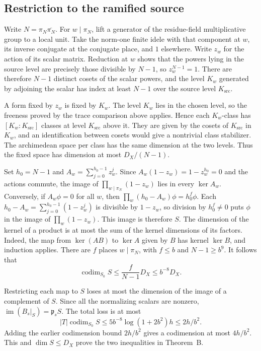 \subsection{Restriction to the ramified source}

Write \(N=\pi_N\overline{\pi_N}\). For \(w\mid\pi_N\), lift a generator
of the residue-field multiplicative group to a local unit.
Take the norm-one finite idele with that component at \(w\), its inverse
conjugate at the conjugate place, and \(1\) elsewhere.
Write \(z_w\) for the action of its scalar matrix.
Reduction at \(w\) shows that the powers lying in the source level
are precisely those divisible by \(N-1\), so \(z_w^{N-1}=1\).
There are therefore \(N-1\) distinct cosets of the scalar powers,
and the level \(K_w\) generated by adjoining the scalar has index at
least \(N-1\) over the source level \(K_{\mathrm{src}}\).

A form fixed by \(z_w\) is fixed by \(K_w\).
The level \(K_w\) lies in the chosen level, so the freeness proved by
the trace comparison above applies. Hence each \(K_w\)-class has
\([K_w:K_{\mathrm{src}}]\) classes at level \(K_{\mathrm{src}}\) above it.
They are given by the cosets of \(K_{\mathrm{src}}\) in \(K_w\), and
an identification between cosets would give a nontrivial class
stabilizer. The archimedean space per class has the same dimension
at the two levels. Thus the fixed space has dimension at most
\(D_X/(N-1)\).

Set \(h_0=N-1\) and \(A_w=\sum_{j=0}^{h_0-1}z_w^j\).
Since \(A_w(1-z_w)=1-z_w^{h_0}=0\) and the actions commute,
the image of \(\prod_{w\mid\pi_N}(1-z_w)\) lies in every \(\ker A_w\).
Conversely, if \(A_w\phi=0\) for all \(w\), then
\(\prod_w(h_0-A_w)\phi=h_0^f\phi\).
Each \(h_0-A_w=\sum_{j=0}^{h_0-1}(1-z_w^j)\) is divisible by \(1-z_w\),
so division by \(h_0^f\ne0\) puts \(\phi\) in the image of
\(\prod_w(1-z_w)\). This image is therefore \(S\).
The dimension of the kernel of a product is at most the sum of the
kernel dimensions of its factors. Indeed, the map from \(\ker(AB)\)
to \(\ker A\) given by \(B\) has kernel \(\ker B\), and induction applies.
There are \(f\) places \(w\mid\pi_N\), with \(f\le b\) and \(N-1\ge b^9\).
It follows that
\[
 \operatorname{codim}_{S_0} S\le \frac{f}{N-1}D_X\le b^{-8}D_X.
\]

Restricting each map to \(S\) loses at most the dimension of the image
of a complement of \(S\). Since all the normalizing scalars are nonzero,
\(\operatorname{im}(B_s|_S)=\mathfrak p_sS\). The total loss is at most
\[
   |T|\operatorname{codim}_{S_0}S
   \le 5b^{-8}\log(1+2b^2)h\le 2h/b^2.
\]
Adding the earlier codimension bound \(2h/b^2\) gives a codimension
at most \(4h/b^2\). This and \(\dim S\le D_X\) prove the two inequalities
in Theorem~B.
